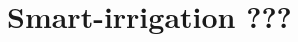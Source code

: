 \documentclass[a4paper,12pt,times,numbered,print,index]{Classes/PhDThesisPSnPDF}
\begin{document}
\chapter{Smart-irrigation ???}
\label{precision-chap:smart-irrigation}

% 
% 
% 
% 
% 

% 
% 
% 
% 
% 
% 


\begin{spacing}{.8}

\cleardoublepage

\end{spacing}

% 
% 

\end{document}
